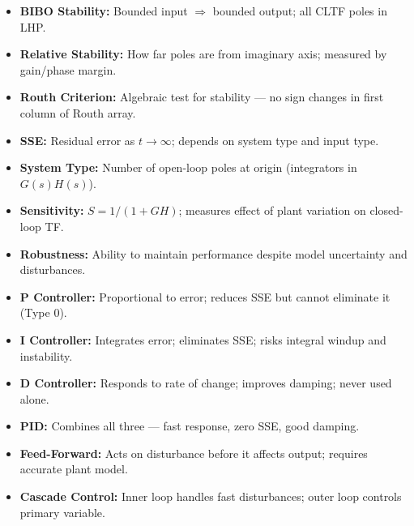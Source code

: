 \documentclass[12pt,a4paper]{article}
\begin{document}
\begin{tcolorbox}[defbox, title={\textbf{One-Line Definitions}}]
\begin{itemize}[leftmargin=*, itemsep=3pt, topsep=0pt]
  \item \textbf{BIBO Stability:} Bounded input $\Rightarrow$ bounded output; all CLTF poles in LHP.
  \item \textbf{Relative Stability:} How far poles are from imaginary axis; measured by gain/phase margin.
  \item \textbf{Routh Criterion:} Algebraic test for stability — no sign changes in first column of Routh array.
  \item \textbf{SSE:} Residual error as $t\to\infty$; depends on system type and input type.
  \item \textbf{System Type:} Number of open-loop poles at origin (integrators in $G(s)H(s)$).
  \item \textbf{Sensitivity:} $S = 1/(1+GH)$; measures effect of plant variation on closed-loop TF.
  \item \textbf{Robustness:} Ability to maintain performance despite model uncertainty and disturbances.
  \item \textbf{P Controller:} Proportional to error; reduces SSE but cannot eliminate it (Type 0).
  \item \textbf{I Controller:} Integrates error; eliminates SSE; risks integral windup and instability.
  \item \textbf{D Controller:} Responds to rate of change; improves damping; never used alone.
  \item \textbf{PID:} Combines all three — fast response, zero SSE, good damping.
  \item \textbf{Feed-Forward:} Acts on disturbance before it affects output; requires accurate plant model.
  \item \textbf{Cascade Control:} Inner loop handles fast disturbances; outer loop controls primary variable.
\end{itemize}
\end{tcolorbox}

\vspace{5pt}
\end{document}
